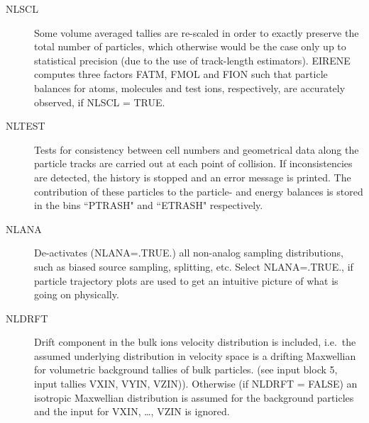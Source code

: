 \begin{description}
  \item[NLSCL] Some volume averaged tallies are re-scaled in order to exactly
        preserve the total number of particles, which otherwise would be the case only
        up to statistical precision (due to the use of track-length estimators).
        EIRENE computes three factors FATM, FMOL and FION such that particle balances
        for atoms, molecules and test ions, respectively, are accurately observed, if
        NLSCL = TRUE.
  \item[NLTEST] Tests for consistency between cell numbers and geometrical data
        along the particle tracks are carried out at each point of collision.
        If inconsistencies are detected, the history is stopped and an error message is
        printed.
        The contribution of these particles to the particle- and energy balances is
        stored in the bins ``PTRASH" and ``ETRASH" respectively.
  \item[NLANA] De-activates (NLANA=.TRUE.) all non-analog sampling distributions, such 
        as biased source sampling, splitting, etc.
        Select NLANA=.TRUE., if particle trajectory plots are used to get an intuitive
        picture of what is going on physically.
  \item[NLDRFT] Drift component in the bulk ions velocity distribution is
        included, i.e.\ the assumed underlying distribution in velocity space is a
        drifting Maxwellian for volumetric background tallies of bulk particles.
        (see input block 5, input tallies VXIN, VYIN, VZIN)).
        Otherwise (if NLDRFT = FALSE) an isotropic Maxwellian distribution is assumed
        for the background particles and the input for VXIN, \dots, VZIN is ignored.


\end{description}
